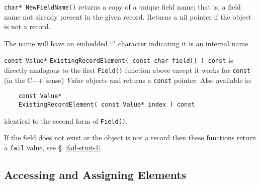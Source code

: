 \begin{sloppy}
\begin{list}{}{}
\item[{\tt char* NewFieldName()}] returns
a copy of a unique field name;
that is, a field name not already present in the given record.  Returns
a nil pointer if the object is not a record.

The name will have an embedded ``{\tt *}" character indicating it is
an internal name.

\item[{\tt const Value*}] {\tt ExistingRecordElement( const char field[] )
const} is directly
analogous to the first {\tt Field()} function above except it
works for {\tt const} (in the C++ sense) {\em Value} objects and returns
a {\tt const} pointer.  Also available is:
\begin{verbatim}
    const Value*
    ExistingRecordElement( const Value* index ) const
\end{verbatim}
identical to the second form of {\tt Field()}.

If the field does not exist or the object is not a record then these functions
return a {\tt fail} value, see \S~\ref{fail-stmt-1}.

\end{list}
\end{sloppy}

\subsection{Accessing and Assigning Elements}

